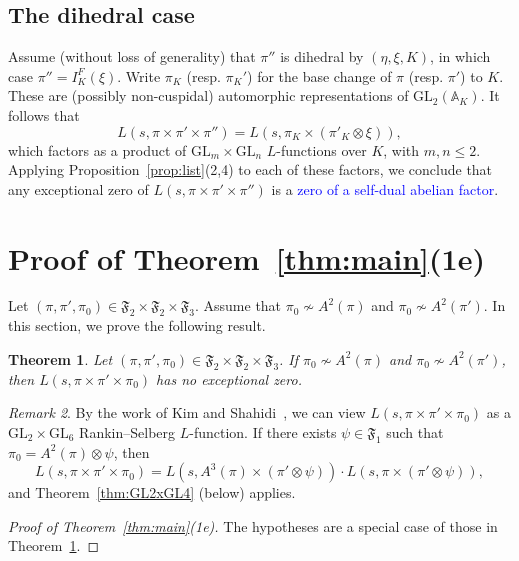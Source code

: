\documentclass[11pt]{amsart}
\newtheorem{theorem}{Theorem}[section]
\theoremstyle{remark}
\newtheorem{remark}[theorem]{Remark}
\newcommand{\GL}{\mathrm{GL}}
\newcommand{\fF}{\mathfrak{F}}
\numberwithin{equation}{section}
\begin{document}
\subsection{The dihedral case}
Assume (without loss of generality) that $\pi''$ is dihedral by $(\eta,\xi,K)$, in which case $\pi'' = I_K^F(\xi)$.  Write $\pi_K$ (resp. $\pi_K'$) for the base change of $\pi$ (resp. $\pi'$) to $K$.  These are (possibly non-cuspidal) automorphic representations of $\GL_2(\mathbb{A}_K)$.  It follows that
\[
L(s,\pi \times \pi' \times \pi'') = L(s,\pi_K \times (\pi'_K \otimes \xi)),
\]
which factors as a product of $\GL_m \times \GL_n$ $L$-functions over $K$, with $m,n \leq 2$.  Applying Proposition~\ref{prop:list}(2,4) to each of these factors, we conclude that any exceptional zero of $L(s,\pi \times \pi' \times \pi'')$ is a \textcolor{blue}{zero of a self-dual abelian factor}.





\section{Proof of Theorem~\ref{thm:main}(1e)}
\label{sec:1e}

Let $(\pi,\pi',\pi_0) \in \fF_2\times \fF_2\times \fF_3$.  Assume that $\pi_0 \not\sim A^2(\pi)$ and $\pi_0 \not\sim A^2(\pi')$. In this section, we prove the following result.

\begin{theorem}
\label{thm:GL2xGL2xGL3}
Let $(\pi,\pi',\pi_0)\in\mathfrak{F}_2\times \mathfrak{F}_2\times \mathfrak{F}_3$.  If $\pi_0\not\sim A^2(\pi)$ and $\pi_0\not\sim A^2(\pi')$, then $L(s,\pi\times\pi'\times\pi_0)$ has no exceptional zero.
\end{theorem}
\begin{remark}
By the work of Kim and Shahidi~\cite{KimShahidi}, we can view $L(s,\pi\times\pi'\times\pi_0)$ as a $\GL_2\times\GL_6$ Rankin--Selberg $L$-function.  If there exists $\psi\in\mathfrak{F}_1$ such that $\pi_0=A^2(\pi)\otimes\psi$, then
\[
L(s,\pi\times\pi'\times\pi_0)=L(s,A^3(\pi)\times(\pi'\otimes\psi))\cdot L(s,\pi\times(\pi'\otimes\psi)),
\]
and Theorem~\ref{thm:GL2xGL4} (below) applies.
\end{remark}
\begin{proof}[Proof of Theorem~\ref{thm:main}(1e)]
The hypotheses are a special case of those in Theorem~\ref{thm:GL2xGL2xGL3}.
\end{proof}
\end{document}

